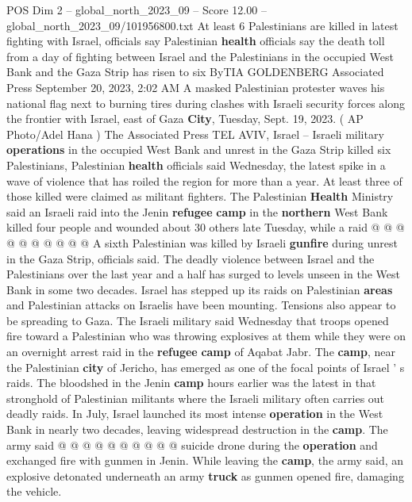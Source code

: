\begin{textsample}{POS Dim 2 – global\_north\_2023\_09 – Score 12.00 – global\_north\_2023\_09/101956800.txt}  \label{ex:f2_pos_373}
At least 6 Palestinians are killed in latest fighting with Israel, officials say Palestinian \textbf{health} officials say the death toll from a day of fighting between Israel and the Palestinians in the occupied West Bank and the Gaza Strip has risen to six ByTIA GOLDENBERG Associated Press September 20, 2023, 2:02 AM A masked Palestinian protester waves his national flag next to burning tires during clashes with Israeli security forces along the frontier with Israel, east of Gaza \textbf{City}, Tuesday, Sept. 19, 2023. ( AP Photo/Adel Hana ) The Associated Press TEL AVIV, Israel -- Israeli military \textbf{operations} in the occupied West Bank and unrest in the Gaza Strip killed six Palestinians, Palestinian \textbf{health} officials said Wednesday, the latest spike in a wave of violence that has roiled the region for more than a year.
At least three of those killed were claimed as militant fighters.
The Palestinian \textbf{Health} Ministry said an Israeli raid into the Jenin \textbf{refugee} \textbf{camp} in the \textbf{northern} West Bank killed four people and wounded about 30 others late Tuesday, while a raid @ @ @ @ @ @ @ @ @ @ A sixth Palestinian was killed by Israeli \textbf{gunfire} during unrest in the Gaza Strip, officials said.
The deadly violence between Israel and the Palestinians over the last year and a half has surged to levels unseen in the West Bank in some two decades.
Israel has stepped up its raids on Palestinian \textbf{areas} and Palestinian attacks on Israelis have been mounting.
Tensions also appear to be spreading to Gaza.
The Israeli military said Wednesday that troops opened fire toward a Palestinian who was throwing explosives at them while they were on an overnight arrest raid in the \textbf{refugee} \textbf{camp} of Aqabat Jabr.
The \textbf{camp}, near the Palestinian \textbf{city} of Jericho, has emerged as one of the focal points of Israel ' s raids.
The bloodshed in the Jenin \textbf{camp} hours earlier was the latest in that stronghold of Palestinian militants where the Israeli military often carries out deadly raids.
In July, Israel launched its most intense \textbf{operation} in the West Bank in nearly two decades, leaving widespread destruction in the \textbf{camp}.
The army said @ @ @ @ @ @ @ @ @ @ suicide drone during the \textbf{operation} and exchanged fire with gunmen in Jenin.
While leaving the \textbf{camp}, the army said, an explosive detonated underneath an army \textbf{truck} as gunmen opened fire, damaging the vehicle.

\end{textsample}
